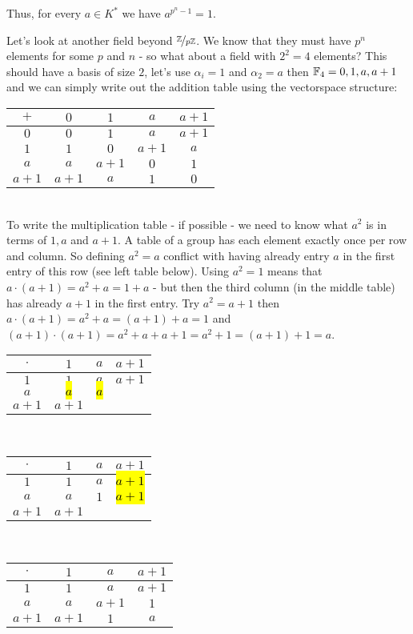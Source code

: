 Thus, for every $a \in K^{\ast}$ we have $a^{p^n-1} = 1$.

Let's look at another field beyond $\nicefrac{\mathbb{Z}}{p \mathbb{Z}}$. We know that they must have $p^n$ elements for some $p$ and $n$ - so what about a field with $2^2 = 4$ elements? This should have a basis of size $2$, let's use $\alpha_i = 1$ and $\alpha_2 =a$ then $\mathbb{F}_4 = {0,1,a,a+1}$ and we can simply write out the addition table using the vectorspace structure: \\

\begin{tabular}{c|cccc}
$+$ &  $0$ & $1$ & $a$ & $a+1$ \\
\hline 
$0$ & $0$ & $1$ & $a$ & $a+1$  \\
$1$ & $1$ & $0$ & $a+1$ & $a$  \\
$a$ & $a$ & $a+1$ & $0$ & $1$  \\
$a+1$ & $a+1$ & $a$ & $1$ & $0$  \\
\end{tabular} \\

To write the multiplication table - if possible - we need to know what $a^2$ is in terms of $1, a$ and $a+1$. A table of a group has each element exactly once per row and column. So defining $a^2 = a$ conflict with having already entry $a$ in the first entry of this row (see left table below). Using $a^2 =1$ means that $a \cdot (a+1) = a^2 + a = 1 + a$ - but then the third column (in the middle table) has already $a+1$ in the first entry. Try $a^2 = a + 1$ then $a \cdot (a+1) = a^2 + a = (a+1) + a = 1$ and $(a+1) \cdot (a+1) = a^2 +a +a +1= a^2 +1 = (a+1)+1 = a$. \\

\begin{tabular}{c|ccc}
$\cdot$ &  $1$ & $a$ & $a+1$ \\
\hline 
$1$ & $1$ & $a$ & $a+1$  \\
$a$ & \hl{$a$} & \hl{$a$} &   \\
$a+1$ & $a+1$ &  &   \\
\end{tabular} \,\,
\begin{tabular}{c|ccc}
$\cdot$ & $1$ & $a$ & $a+1$ \\
\hline 
$1$ & $1$ & $a$ & \hl{$a+1$}  \\
$a$ & $a$ & $1$ & \hl{$a+1$}  \\
$a+1$ & $a+1$ &  &   \\
\end{tabular} \,\,
\begin{tabular}{c|ccc}
$\cdot$ &  $1$ & $a$ & $a+1$ \\
\hline 
$1$ & $1$ & $a$ & $a+1$  \\
$a$ & $a$ & $a+1$ & $1$  \\
$a+1$ & $a+1$ & $1$  & $a$  \\
\end{tabular} \\

